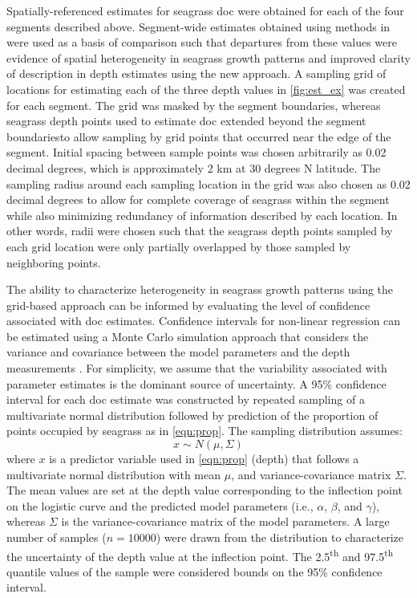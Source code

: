 \documentclass[letterpaper,12pt,oneside]{article}\usepackage[]{graphicx}\usepackage[]{color}
\begin{document}
Spatially-referenced estimates for seagrass \ac{doc} were obtained for each of the four segments described above.  Segment-wide estimates obtained using methods in  were used as a basis of comparison such that departures from these values were evidence of spatial heterogeneity in seagrass growth patterns and improved clarity of description in depth estimates using the new approach.  A sampling grid of locations for estimating each of the three depth values in \cref{fig:est_ex} was created for each segment.  The grid was masked by the segment boundaries, whereas seagrass depth points used to estimate \ac{doc} extended beyond the segment boundariesto allow sampling by grid points that occurred near the edge of the segment.  Initial spacing between sample points was chosen arbitrarily as 0.02 decimal degrees, which is approximately 2 km at 30 degrees N latitude.  The sampling radius around each sampling location in the grid was also chosen as 0.02 decimal degrees to allow for complete coverage of seagrass within the segment while also minimizing redundancy of information described by each location.  In other words, radii were chosen such that the seagrass depth points sampled by each grid location were only partially overlapped by those sampled by neighboring points.

The ability to characterize heterogeneity in seagrass growth patterns using the grid-based approach can be informed by evaluating the level of confidence associated with \ac{doc} estimates.  Confidence intervals for non-linear regression can be estimated using a Monte Carlo simulation approach that considers the variance and covariance between the model parameters and the depth measurements \citep{Hilborn97}.  For simplicity, we assume that the variability associated with parameter estimates is the dominant source of uncertainty.  A 95\% confidence interval for each \ac{doc} estimate was constructed by repeated sampling of a multivariate normal distribution followed by prediction of the proportion of points occupied by seagrass as in \cref{eqn:prop}.  The sampling distribution assumes:
\begin{equation}
x \sim N(\mu, \Sigma)
\end{equation}
\noindent where $x$ is a predictor variable used in \cref{eqn:prop} (depth) that follows a multivariate normal distribution with mean $\mu$, and variance-covariance matrix $\Sigma$.  The mean values are set at the depth value corresponding to the inflection point on the logistic curve and the predicted model parameters (i.e., $\alpha$, $\beta$, and $\gamma$), whereas $\Sigma$ is the variance-covariance matrix of the model parameters.  A large number of samples ($n = 10000$) were drawn from the distribution to characterize the uncertainty of the depth value at the inflection point.  The 2.5\textsuperscript{th} and 97.5\textsuperscript{th} quantile values of the sample were considered bounds on the 95\% confidence interval.
\end{document}
